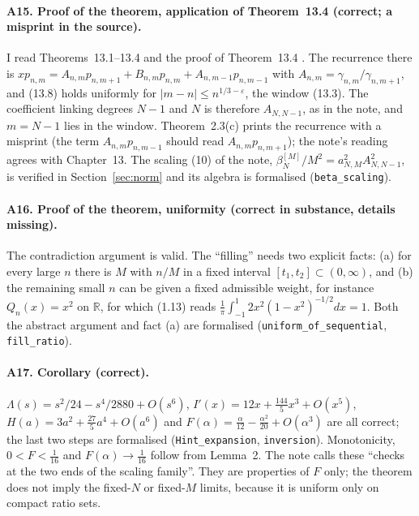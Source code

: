 \documentclass[11pt,a4paper]{article}
\theoremstyle{remark}
\newcommand{\R}{\mathbb R}
\numberwithin{equation}{section}
\begin{document}
\paragraph{A15. Proof of the theorem, application of Theorem~13.4 (correct; a misprint in
the source).} I read Theorems~13.1--13.4 \cite[pp.~123--124]{levinlubinsky2018} and the
proof of Theorem~13.4 \cite[p.~138]{levinlubinsky2018}. The recurrence there is
$xp_{n,m}=A_{n,m}p_{n,m+1}+B_{n,m}p_{n,m}+A_{n,m-1}p_{n,m-1}$ with
$A_{n,m}=\gamma_{n,m}/\gamma_{n,m+1}$, and (13.8) holds uniformly for $|m-n|\le
n^{1/3-\varepsilon}$, the window (13.3). The coefficient linking degrees $N-1$ and $N$ is
therefore $A_{N,N-1}$, as in the note, and $m=N-1$ lies in the window. Theorem~2.3(c)
\cite[p.~12]{levinlubinsky2018} prints the recurrence with a misprint (the term
$A_{n,m}p_{n,m-1}$ should read $A_{n,m}p_{n,m+1}$); the note's reading agrees with Chapter~13. The scaling
(10) of the note, $\beta_N^{[M]}/M^2=a_{N,M}^2A_{N,N-1}^2$, is verified in
Section~\ref{sec:norm} and its algebra is formalised (\texttt{beta\_scaling}).

\paragraph{A16. Proof of the theorem, uniformity (correct in substance, details
missing).} The contradiction argument is valid. The ``filling'' needs two explicit
facts: (a) for every large $n$ there is $M$ with $n/M$ in a fixed interval
$[t_1,t_2]\subset(0,\infty)$, and (b) the remaining small $n$ can be given a fixed admissible
weight, for instance $Q_n(x)=x^2$ on $\R$, for which (1.13) reads
$\frac1\pi\int_{-1}^1 2x^2(1-x^2)^{-1/2}dx=1$. Both the abstract argument and fact (a) are
formalised (\texttt{uniform\_of\_sequential}, \texttt{fill\_ratio}).

\paragraph{A17. Corollary (correct).} $\Lambda(s)=s^2/24-s^4/2880+O(s^6)$,
$I'(x)=12x+\frac{144}{5}x^3+O(x^5)$, $H(a)=3a^2+\frac{27}{5}a^4+O(a^6)$ and
$F(\alpha)=\frac{\alpha}{12}-\frac{\alpha^2}{20}+O(\alpha^3)$ are all correct; the last two
steps are formalised (\texttt{Hint\_expansion}, \texttt{inversion}). Monotonicity,
$0<F<\frac1{16}$ and $F(\alpha)\to\frac1{16}$ follow from Lemma~2. The note calls these
``checks at the two ends of the scaling family''. They are properties of $F$ only; the
theorem does not imply the fixed-$N$ or fixed-$M$ limits, because it is uniform only on
compact ratio sets.
\end{document}
